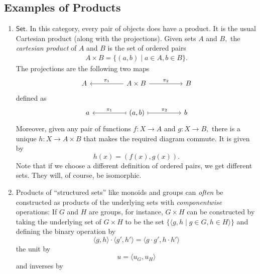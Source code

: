 \subsection{Examples of Products}
\begin{enumerate}
	\item $\mathsf{Set}.$ In this category, every pair of objects does have a product. It is the usual Cartesian product (along with the projections). Given sets $A$ and $B,$ the \emph{cartesian product} of $A$ and $B$ is the set of ordered pairs
	\begin{align*} 
		A \times B = \{(a, b) \mid a \in A, b \in B\}.
	\end{align*}
	The projections are the following two maps
	\begin{equation*} 
		\begin{tikzcd}
			A && A \times B \arrow[ll, "\pi_1"'] \arrow[rr, "\pi_2"] && B
		\end{tikzcd}
	\end{equation*}
	defined as
	\begin{equation*} 
		\begin{tikzcd}
			a && (a, b) \arrow[ll, maps to, "\pi_1"'] \arrow[rr, maps to, "\pi_2"] && b
		\end{tikzcd}
	\end{equation*}
	Moreover, given any pair of functions $f:X\to A$ and $g:X\to B,$ there is a unique $h:X\to A\times B$ that makes the required diagram commute. It is given by
	\begin{equation*} 
		h(x) = (f(x), g(x)).
	\end{equation*}
	Note that if we choose a different definition of ordered pairs, we get different sets. They will, of course, be isomorphic.
	\item Products of ``structured sets'' like monoids and groups can \emph{often} be constructed as products of the underlying sets with \emph{componentwise} operations: If $G$ and $H$ are groups, for instance, $G\times H$ can be constructed by taking the underlying set of $G \times H$ to be the set $\{\langle g, h \mid g \in G, h \in H\rangle\}$ and defining the binary operation by
	\begin{equation*} 
		\langle g, h\rangle\cdot\langle g', h'\rangle = \langle g\cdot g', h\cdot h'\rangle
	\end{equation*}
	the unit by
	\begin{equation*} 
		u = \langle u_G, u_H\rangle
	\end{equation*}
	and inverses by
	\begin{equation*} 

\end{equation*}
\end{enumerate}
